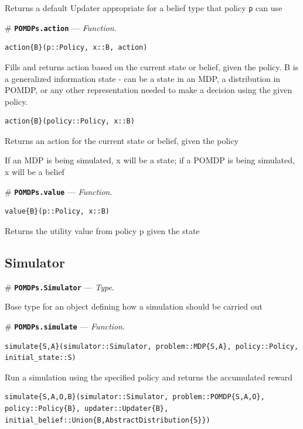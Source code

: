 \documentclass[12pt,]{article}
\begin{document}
Returns a default Updater appropriate for a belief type that policy
\texttt{p} can use

\# \textbf{\texttt{POMDPs.action}} --- \emph{Function}.

\begin{verbatim}
action{B}(p::Policy, x::B, action)
\end{verbatim}

Fills and returns action based on the current state or belief, given the
policy. B is a generalized information state - can be a state in an MDP,
a distribution in POMDP, or any other representation needed to make a
decision using the given policy.

\begin{verbatim}
action{B}(policy::Policy, x::B)
\end{verbatim}

Returns an action for the current state or belief, given the policy

If an MDP is being simulated, x will be a state; if a POMDP is being
simulated, x will be a belief

\# \textbf{\texttt{POMDPs.value}} --- \emph{Function}.

\begin{verbatim}
value{B}(p::Policy, x::B)
\end{verbatim}

Returns the utility value from policy p given the state

\subsection{Simulator}\label{simulator}

\# \textbf{\texttt{POMDPs.Simulator}} --- \emph{Type}.

Base type for an object defining how a simulation should be carried out

\# \textbf{\texttt{POMDPs.simulate}} --- \emph{Function}.

\begin{verbatim}
simulate{S,A}(simulator::Simulator, problem::MDP{S,A}, policy::Policy, initial_state::S)
\end{verbatim}

Run a simulation using the specified policy and returns the accumulated
reward

\begin{verbatim}
simulate{S,A,O,B}(simulator::Simulator, problem::POMDP{S,A,O}, policy::Policy{B}, updater::Updater{B}, initial_belief::Union{B,AbstractDistribution{S}})
\end{verbatim}
\end{document}
